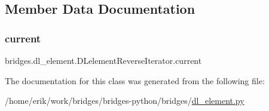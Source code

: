 \subsection{Member Data Documentation}
\mbox{\label{classbridges_1_1dl__element_1_1_d_lelement_reverse_iterator_ae634b4f334d905570d98692f9ad3c836}} 
\subsubsection{\texorpdfstring{current}{current}}
{\footnotesize\ttfamily bridges.\+dl\+\_\+element.\+D\+Lelement\+Reverse\+Iterator.\+current}



The documentation for this class was generated from the following file\+:\begin{DoxyCompactItemize}
\item 
/home/erik/work/bridges/bridges-\/python/bridges/\hyperlink{dl__element_8py}{dl\+\_\+element.\+py}\end{DoxyCompactItemize}
